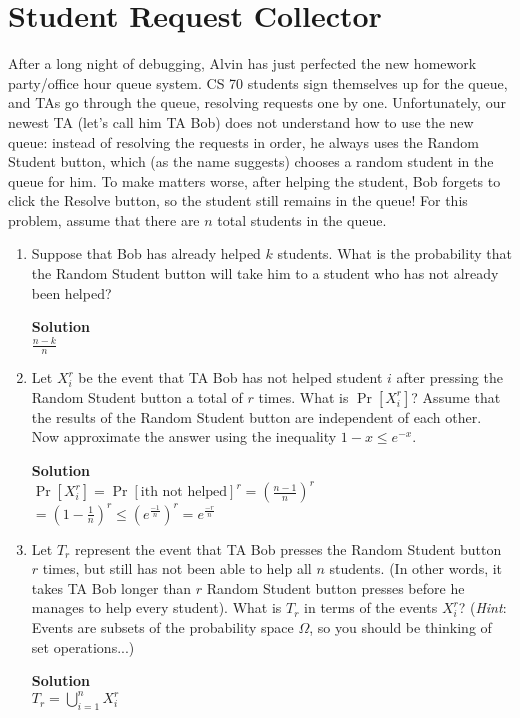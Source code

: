 \documentclass[11pt]{article}
\newcommand*{\Question}[1]{\section{#1}}
\newenvironment{Parts}{\begin{enumerate}[label=(\alph*)]}{\end{enumerate}}
\newcommand*{\Part}{\item}
\begin{document}
\Question{Student Request Collector} 

After a long night of debugging, Alvin has just perfected the new homework party/office hour queue system. CS 70 students sign themselves up for the queue, and TAs go through the queue, resolving requests one by one. Unfortunately, our newest TA (let's call him TA Bob) does not understand how to use the new queue: instead of resolving the requests in order, he always uses the Random Student button, which (as the name suggests) chooses a random student in the queue for him. To make matters worse, after helping the student, Bob forgets to click the Resolve button, so the student still remains in the queue! For this problem, assume that there are $n$ total students in the queue.
\begin{Parts}
	\Part Suppose that Bob has already helped $k$ students. What is the probability that the Random Student button will take him to a student who has not already been helped?
\begin{mdframed} \textbf{Solution} \\
$\frac{n-k}{n}$
\end{mdframed}

	\Part Let $X_i^r$ be the event that TA Bob has not helped student $i$ after pressing the Random Student button a total of $r$ times. What is $\Pr[X_i^r]$? Assume that the results of the Random Student button are independent of each other. Now approximate the answer using the inequality $1-x \leq e^{-x}$.
\begin{mdframed} \textbf{Solution} \\
$\Pr[X_i^r] = \Pr[\text{ith not helped}]^r = (\frac{n-1}{n})^r$ \\
$= (1-\frac{1}{n})^r \leq (e^{\frac{-1}{n}})^r = e^{\frac{-r}{n}}$
\end{mdframed}

	\Part Let $T_r$ represent the event that TA Bob presses the Random Student button $r$ times, but still has not been able to help all $n$ students. (In other words, it takes TA Bob longer than $r$ Random Student button presses before he manages to help every student). What is $T_r$ in terms of the events $X_i^r$? (\textit{Hint}: Events are subsets of the probability space $\Omega$, so you should be thinking of set operations...)
\begin{mdframed} \textbf{Solution} \\
$T_r = \bigcup\limits_{i=1}^{n}X_i^r$
\end{mdframed}


\end{Parts}
\end{document}
